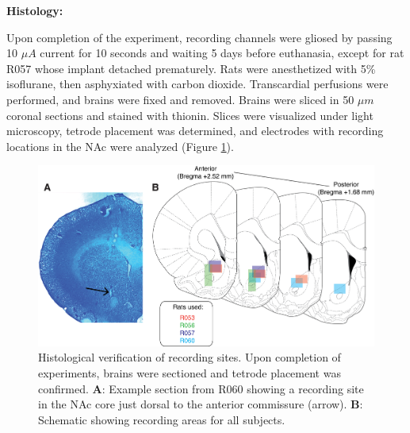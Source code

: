 \documentclass[11pt]{article}
\newcommand{\bsf}[1]{\textbf{#1}}
\begin{document}
{\bf Histology:}

Upon completion of the experiment, recording channels were gliosed by passing 10 $\mu A$ current for 10 seconds and waiting 5 days before euthanasia, except for rat R057 whose implant detached prematurely. Rats were anesthetized with 5\%
isoflurane, then asphyxiated with carbon dioxide. Transcardial
perfusions were performed, and brains were fixed and removed. Brains
were sliced in 50 $\mu m$ coronal sections and stained with
thionin. Slices were visualized under light microscopy, tetrode
placement was determined, and electrodes with recording locations in
the NAc were analyzed (Figure \ref{fig:histo}).

 \begin{figure}[ht!]
\centering
\includegraphics[width=\textwidth]{Fig 9 - Histology.png}
\caption{Histological verification of recording sites. Upon completion of
  experiments, brains were sectioned and tetrode placement was
  confirmed. \bsf{A}: Example section from R060 showing a recording site in the
  NAc core just dorsal to the anterior commissure (arrow). \bsf{B}:
  Schematic showing recording areas for all subjects.}
\label{fig:histo}
\end{figure} \clearpage


\end{document}
